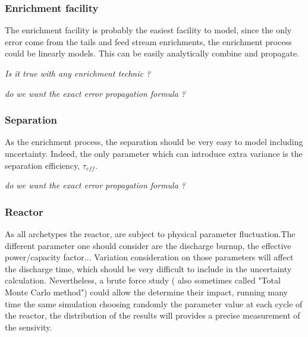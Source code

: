 \documentclass[dvips,12pt]{article}
\begin{document}
\subsubsection{Enrichment facility}
The enrichment facility is probably the easiest
facility to model, since the only error come from
the tails and feed stream enrichments, the
enrichment process could be linearly models. This
can be easily analytically combine and propagate.



\textit{Is it true with any enrichment technic ?}

\textit{do we want the exact error propagation formula ?}

\subsubsection{Separation}
As the enrichment process, the separation should
be very easy to model including
uncertainty. Indeed, the only parameter which can
introduce extra variance is the separation
efficiency, $\tau_{eff}$.



\textit{do we want the exact error propagation formula ?}

\subsubsection{Reactor}
As all archetypes the reactor, are subject to
physical parameter fluctuation.The different
parameter one should consider are the discharge
burnup, the effective power/capacity
factor... Variation consideration on those
parameters will affect the discharge time, which
should be very difficult to include in the
uncertainty calculation. Nevertheless, a brute
force study ( also sometimes called "Total Monte
Carlo method") could allow the determine their
impact, running many time the same simulation
choosing randomly the parameter value at each
cycle of the reactor, the distribution of the
results will provides a precise measurement of the
sensivity.\\
\end{document}
